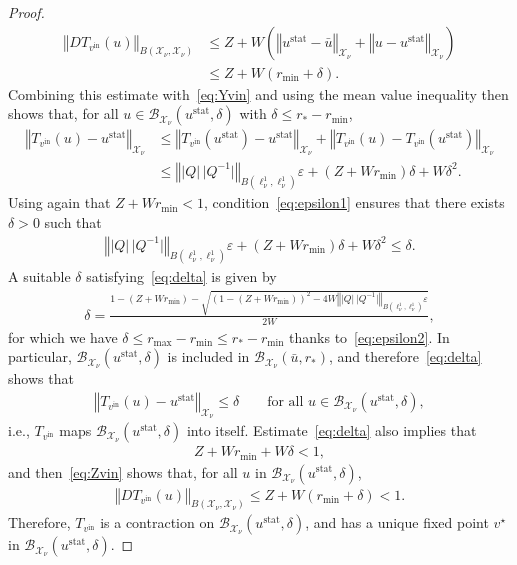 \documentclass[10pt,a4paper]{article}
\theoremstyle{plain}
\newcommand{\B}{\mathcal{B}}
\renewcommand{\B}{\mathcal{B}}
\newcommand{\X}{\mathcal{X}}
\newcommand{\bu}{\bar{u}}
\newcommand{\1}{\mathbf{1}}
\newcommand{\rstar}{r_*}
\newcommand{\vin}{{v^{\mathrm{in}}}}
\newcommand{\stat}{\mathrm{stat}}
\begin{document}
\begin{proof}
\begin{align}
\label{eq:Zvin}
\left\Vert DT_\vin(u) \right\Vert_{B(\X_\nu,\X_\nu)} 
&\leq Z + W \left(\left\Vert u^\stat - \bu\right\Vert_{\X_\nu} + \left\Vert u - u^\stat\right\Vert_{\X_\nu} \right) \nonumber\\
&\leq Z + W \left(r_{\min} + \delta \right).
\end{align}
Combining this estimate with~\eqref{eq:Yvin} and using the mean value inequality then shows that, for all $u\in \B_{\X_\nu}(u^\stat,\delta)$ with $\delta\leq \rstar-r_{\min}$,
\begin{align*}
\left\Vert T_\vin(u) - u^\stat \right\Vert_{\X_\nu} &\leq \left\Vert T_\vin(u^\stat) - u^\stat \right\Vert_{\X_\nu} + \left\Vert T_\vin(u) - T_\vin(u^\stat) \right\Vert_{\X_\nu} \\
&\leq \left\Vert \vert Q\vert\, \vert Q^{-1}\vert \right\Vert_{B(\ell^1_\nu,\ell^1_\nu)} \varepsilon + \left(Z + Wr_{\min} \right)\delta  + W \delta^2.
\end{align*}
Using again that $Z + Wr_{\min}< 1$, condition~\eqref{eq:epsilon1} ensures that there exists $\delta>0$ such that 
\begin{align}
\label{eq:delta}
\left\Vert \vert Q\vert\, \vert Q^{-1}\vert \right\Vert_{B(\ell^1_\nu,\ell^1_\nu)} \varepsilon + \left(Z + Wr_{\min} \right)\delta  + W \delta^2 \leq \delta.
\end{align}
A suitable $\delta$ satisfying~\eqref{eq:delta} is given by
\begin{align*}
\delta = \frac{1-(Z+Wr_{\min}) - \sqrt{\left(1-(Z+Wr_{\min})\right)^2 - 4 W\left\Vert \vert Q\vert\, \vert Q^{-1}\vert \right\Vert_{B(\ell^1_\nu,\ell^1_\nu)}\varepsilon}}{2W},
\end{align*}
for which we have $\delta\leq r_{\max}-r_{\min} \leq \rstar - r_{\min}$ thanks to~\eqref{eq:epsilon2}. In particular, $\B_{\X_\nu}(u^\stat,\delta)$ is included in $\B_{\X_\nu}(\bu,\rstar)$, and therefore~\eqref{eq:delta} shows that 
\begin{align*}
\left\Vert T_\vin(u) - u^\stat \right\Vert_{\X_\nu} \leq \delta\qquad \text{for all }u\in \B_{\X_\nu}(u^\stat,\delta),
\end{align*}
i.e., $T_\vin$ maps $\B_{\X_\nu}(u^\stat,\delta)$ into itself. Estimate~\eqref{eq:delta} also implies that
\begin{align*}
Z + Wr_{\min} + W\delta < 1,
\end{align*}
and then~\eqref{eq:Zvin} shows that, for all $u$ in $\B_{\X_\nu}(u^\stat,\delta)$,
\begin{align*}
\left\Vert DT_\vin(u) \right\Vert_{B(\X_\nu,\X_\nu)} \leq Z + W\left(r_{\min} + \delta\right) < 1.
\end{align*}
Therefore, $T_\vin$ is a contraction on $\B_{\X_\nu}(u^\stat,\delta)$, and has a unique fixed point $v^\star$ in $\B_{\X_\nu}(u^\stat,\delta)$. 


\end{proof}
\end{document}
